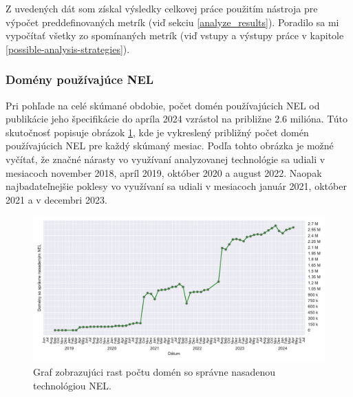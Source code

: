 Z uvedených dát som získal výsledky celkovej práce použitím nástroja pre výpočet preddefinovaných metrík (viď sekciu \ref{analyze_results}).
Poradilo sa mi vypočítať všetky zo spomínaných metrík (viď vstupy a výstupy práce v kapitole \ref{possible-analysis-strategies}).

\subsubsection{Domény používajúce NEL}

Pri pohľade na celé skúmané obdobie, počet domén používajúcich NEL od publikácie jeho špecifikácie do apríla 2024 vzrástol na približne 2.6 milióna. 
Túto skutočnosť popisuje obrázok \ref{fig:httparchive-nel-deployment}, kde je vykreslený približný počet domén používajúcich NEL pre každý skúmaný mesiac.
Podľa tohto obrázka je možné vyčítať, že značné nárasty vo využívaní analyzovanej technológie sa udiali v mesiacoch november 2018, apríl 2019, október 2020 a august 2022.
Naopak najbadateľnejšie poklesy vo využívaní sa udiali v mesiacoch január 2021, október 2021 a v decembri 2023.

\begin{figure}[!htb]
\begin{center}
 \includegraphics[scale=0.59]{obrazky-figures/httparchive_nel_deployment.pdf}
 \caption{Graf zobrazujúci rast počtu domén so správne nasadenou technológiou NEL.}
 \label{fig:httparchive-nel-deployment}
\end{center}
\end{figure}


